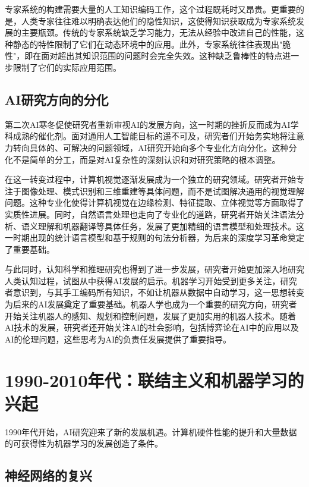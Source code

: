 专家系统的构建需要大量的人工知识编码工作，这个过程既耗时又昂贵。更重要的是，人类专家往往难以明确表达他们的隐性知识，这使得知识获取成为专家系统发展的主要瓶颈。传统的专家系统缺乏学习能力，无法从经验中改进自己的性能，这种静态的特性限制了它们在动态环境中的应用。此外，专家系统往往表现出"脆性"，即在面对超出其知识范围的问题时会完全失效。这种缺乏鲁棒性的特点进一步限制了它们的实际应用范围。

\subsection{AI研究方向的分化}

第二次AI寒冬促使研究者重新审视AI的发展方向，这一时期的挫折反而成为AI学科成熟的催化剂。面对通用人工智能目标的遥不可及，研究者们开始务实地将注意力转向具体的、可解决的问题领域，AI研究开始向多个专业化方向分化。这种分化不是简单的分工，而是对AI复杂性的深刻认识和对研究策略的根本调整。

在这一转变过程中，计算机视觉逐渐发展成为一个独立的研究领域。研究者开始专注于图像处理、模式识别和三维重建等具体问题，而不是试图解决通用的视觉理解问题。这种专业化使得计算机视觉在边缘检测、特征提取、立体视觉等方面取得了实质性进展。同时，自然语言处理也走向了专业化的道路，研究者开始关注语法分析、语义理解和机器翻译等具体任务，发展了更加精细的语言模型和处理技术。这一时期出现的统计语言模型和基于规则的句法分析器，为后来的深度学习革命奠定了重要基础。

与此同时，认知科学和推理研究也得到了进一步发展，研究者开始更加深入地研究人类认知过程，试图从中获得AI发展的启示。机器学习开始受到更多关注，研究者意识到，与其手工编码所有知识，不如让机器从数据中自动学习，这一思想转变为后来的AI发展奠定了重要基础。机器人学也成为一个重要的研究方向，研究者开始关注机器人的感知、规划和控制问题，发展了更加实用的机器人技术。随着AI技术的发展，研究者还开始关注AI的社会影响，包括博弈论在AI中的应用以及AI的伦理问题，这些思考为AI的负责任发展提供了重要指导。

\section{1990-2010年代：联结主义和机器学习的兴起}

1990年代开始，AI研究迎来了新的发展机遇。计算机硬件性能的提升和大量数据的可获得性为机器学习的发展创造了条件。

\subsection{神经网络的复兴}

